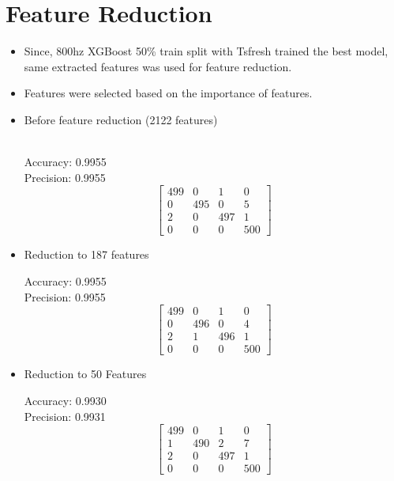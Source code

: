 \documentclass{article}
\begin{document}
\section{Feature Reduction}
\begin{itemize}
    \item Since, 800hz XGBoost 50\% train split with Tsfresh trained the best model, same extracted features was used for feature reduction.
    \item Features were selected based on the importance of features.
    \item Before feature reduction (2122 features)
    \begin{itemize}
            \\
            Accuracy: 0.9955
            \\
            Precision: 0.9955
            \\
            \[
            \begin{bmatrix}
            499 & 0   & 1   & 0 \\
            0   & 495 & 0   & 5 \\
            2   & 0   & 497 & 1 \\
            0   & 0   & 0   & 500
            \end{bmatrix}
            \]
    \end{itemize}
    

    \item Reduction to 187 features
        \begin{itemize}
            Accuracy: 0.9955
            \\
            Precision: 0.9955
            \\
            \[
            \begin{bmatrix}
            499 & 0   & 1   & 0 \\
            0   & 496 & 0   & 4 \\
            2   & 1   & 496 & 1 \\
            0   & 0   & 0   & 500
            \end{bmatrix}
            \]
            
        \end{itemize}
        \clearpage
    

    
    \item Reduction to 50 Features
    \begin{itemize}
 
        Accuracy: 0.9930
        \\
        Precision: 0.9931
        \\
        \[
        \begin{bmatrix}
        499 & 0   & 1   & 0 \\
        1   & 490 & 2   & 7 \\
        2   & 0   & 497 & 1 \\
        0   & 0   & 0   & 500
        \end{bmatrix}
        \]
    \end{itemize}
    


\end{itemize}
\end{document}
